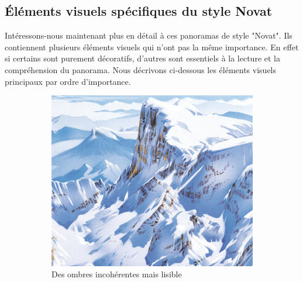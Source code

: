 \subsection{Éléments visuels spécifiques du style Novat}
Intéressons-nous maintenant plus en détail à ces panoramas de style "Novat". Ils contiennent plusieurs éléments visuels qui n'ont pas la même importance. En effet si certains sont purement décoratifs, d'autres sont essentiels à la lecture et la compréhension du panorama. Nous décrivons ci-dessous les éléments visuels principaux par ordre d'importance.



\begin{figure}[!h]
\centering
 \begin{subfigure}[t]{0.47\textwidth}
 \centering
 \includegraphics[width=1.0\linewidth]{novat/PN_zoom_ombre.png}
 \caption{\label{fig:zoom_ombre} Des ombres incohérentes mais lisible}
 \end{subfigure}%
 ~
 \hspace{.05\textwidth}
 \begin{subfigure}[t]{0.47\textwidth}
 \centering

\end{subfigure}
\end{figure}

